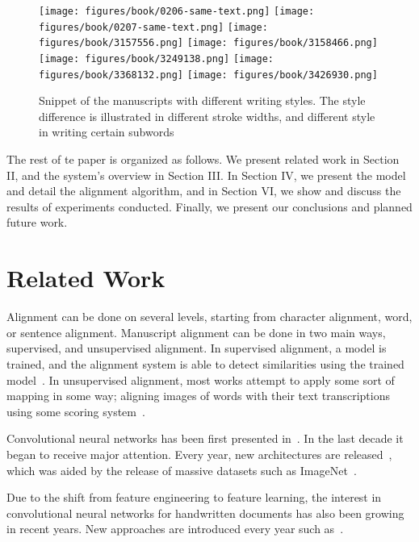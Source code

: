 \documentclass[10pt, a4paper, conference, compsocconf]{IEEEtran}
\begin{document}
\begin{figure*}[!bt]
	\centering
	\texttt{[image: figures/book/0206-same-text.png]}
	\texttt{[image: figures/book/0207-same-text.png]}
	\texttt{[image: figures/book/3157556.png]}
	\texttt{[image: figures/book/3158466.png]}
	\texttt{[image: figures/book/3249138.png]}
	\texttt{[image: figures/book/3368132.png]}
	\texttt{[image: figures/book/3426930.png]}
	\caption{Snippet of the manuscripts with different writing styles. The style difference is illustrated in different stroke widths, and different style in writing certain subwords}
	\label{figure:writingStyles}
\end{figure*}

The rest of te paper is organized as follows. We present related work in Section II, and the system's overview in Section III. In Section IV, we present the model and detail the alignment algorithm, and in Section VI, we show and discuss the results of experiments conducted. Finally, we present our conclusions and planned future work.
\section{Related Work}%
Alignment can be done on several levels, starting from character alignment, word, or sentence alignment. Manuscript alignment can be done in two main ways, supervised, and unsupervised alignment. In supervised alignment, a model is trained, and the alignment system is able to detect similarities using the trained model~\cite{fischer2011transcription, yin2013transcript}. In unsupervised alignment, most works attempt to apply some sort of mapping in some way; aligning images of words with their text transcriptions using some scoring system~\cite{zinger2009text, stamatopoulos2010efficient, stamatopoulos2014novel}. 

Convolutional neural networks has been first presented in~\cite{NIPS1989_293}. In the last decade it began to receive major attention. Every year, new architectures are released~\cite{krizhevsky2012imagenet, zeiler2014visualizing, simonyan2014two, szegedy2017inception}, which was aided by the release of massive datasets such as ImageNet~\cite{russakovsky2015imagenet}.

Due to the shift from feature engineering to feature learning, the interest in convolutional neural networks for handwritten documents has also been growing in recent years. New approaches are introduced every year such as~\cite{sharma2015adapting, jaderberg2014deep, sudholt2016phocnet}.
\end{document}
